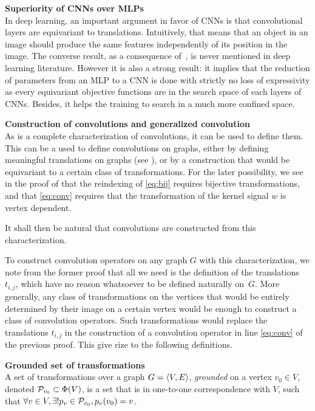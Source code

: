 \begin{remark}\textbf{Superiority of CNNs over MLPs}\\
In deep learning, an important argument in favor of CNNs is that convolutional layers are equivariant to translations. Intuitively, that means that an object in an image should produce the same features independently of its position in the image. The converse result, as a consequence of~, is never mentioned in deep learning literature. However it is also a strong result: it implies that the reduction of parameters from an MLP to a CNN is done with strictly no loss of expressivity as every equivariant objective functions are in the search space of each layers of CNNs. Besides, it helps the training to search in a much more confined space.
\end{remark}

\begin{remark}\textbf{Construction of convolutions and generalized convolution}\\
As  is a complete characterization of convolutions, it can be used to define them. This can be a used to define convolutions on graphs, either by defining meaningful translations on graphs (see \secref{}), or by a construction that would be equivariant to a certain class of transformations. For the later possibility, we see in the proof of  that the reindexing of \eqref{eq:bij} requires bijective transformations, and that \ref{eq:conv} requires that the transformation of the kernel signal $w$ is vertex dependent.
\end{remark}

It shall then be natural that convolutions are constructed from this characterization.

To construct convolution operators on any graph $G$ with this characterization, we note from the former proof that all we need is the definition of the translations $t_{i,j}$, which have no reason whatsoever to be defined naturally on~$G$. More generally, any class of transformations on the vertices that would be entirely determined by their image on a certain vertex would be enough to construct a class of convolution operators. Such transformations would replace the translations $t_{i,j}$ in the construction of a convolution operator in line \eqref{eq:conv} of the previous proof. This give rize to the following definitions.

\begin{definition}\textbf{Grounded set of transformations}\\
A set of transformations over a graph $G = \langle V, E \rangle$, \emph{grounded} on a vertex $v_0 \in V$, denoted $\mathcal{P}_{v_0} \subset \Phi(V)$, is a set that is in one-to-one correspondence with $V$, such that $\forall v \in V, \exists! p_v \in \mathcal{P}_{v_0}, p_v(v_0) = v$.
\end{definition}

